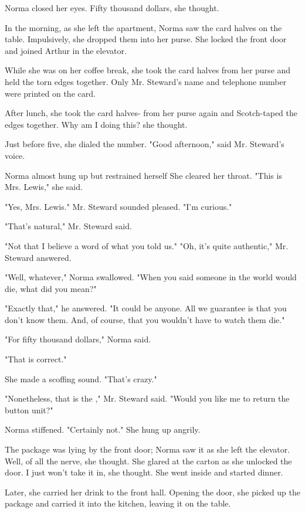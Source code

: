 \documentclass[10pt,a4paper]{book}
\newcommand{\glos}[3]{\dotuline{#1}\marginpar{\scriptsize\textit{#3} #2}}
\begin{document}
Norma closed her eyes. Fifty thousand dollars, she thought.

In the morning, as she left the apartment, Norma saw the card halves on the table. Impulsively, she dropped them into her purse. She locked the front door and joined Arthur in the elevator.

While she was on her coffee break, she took the card halves from her purse and held the torn edges together. Only Mr. Steward's name and telephone number were printed on the card.

After lunch, she took the card halves- from her purse again and Scotch-taped the edges together. Why am I doing this? she thought.



Just before five, she dialed the number. "Good afternoon," said Mr. Steward's voice.

Norma almost hung up but restrained herself She cleared her throat. "This is Mrs. Lewis," she said.

"Yes, Mrs. Lewis." Mr. Steward sounded pleased. "I'm curious."

"That's natural," Mr. Steward said.

"Not that I believe a word of what you told us." "Oh, it's quite authentic," Mr. Steward answered.

"Well, whatever," Norma swallowed. "When you said someone in the world would die, what did you mean?"

"Exactly that," he answered. "It could be anyone. All we guarantee is that you don't know them. And, of course, that you wouldn't have to watch them die."

"For fifty thousand dollars," Norma said.

"That is correct."

She made a scoffing sound. "That's crazy."

"Nonetheless, that is the \glos{proposition}{plan / forslag / tilbud}{sb.}," Mr. Steward said. "Would you like me to return the button unit?"

Norma stiffened. "Certainly not." She hung up angrily.

The package was lying by the front door; Norma saw it as she left the elevator. Well, of all the nerve, she thought. She glared at the carton as she unlocked the door. I just won't take it in, she thought. She went inside and started dinner.

Later, she carried her drink to the front hall. Opening the door, she picked up the package and carried it into the kitchen, leaving it on the table.
\end{document}
